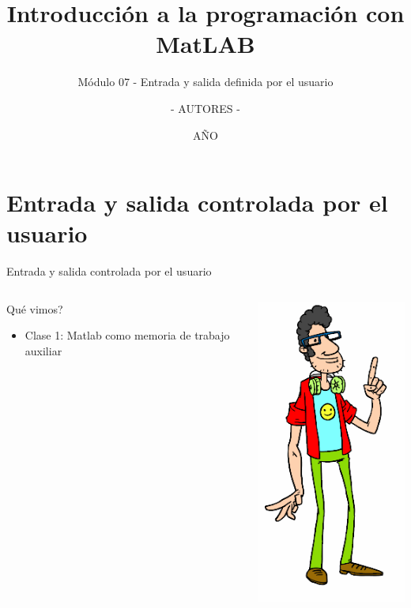 \documentclass{bredelebeamer}
\title[Programación en MatLAB]{Introducción a la programación con MatLAB}
\subtitle{Módulo 07 - Entrada y salida definida por el usuario}
\author{- AUTORES - \inst{1}}
\institute[UNIVERSIDAD]
{
  \inst{1}%
  - NOMBRE UNIVERSIDAD - 
  }
\date{AÑO}
\begin{document}
\begin{frame}
  \titlepage 
\end{frame}





\section{Entrada y salida controlada por el usuario}

\begin{frame}{Entrada y salida controlada por el usuario}
\begin{columns}
\begin{column}{0.5\textwidth}
Qué vimos?
\begin{itemize}
\item Clase 1: Matlab como memoria de trabajo auxiliar
\end{itemize}
\end{column}
\begin{column}{0.5\textwidth}
\begin{center}
\includegraphics[scale=0.3]{images/img42.png}
\end{center}
\end{column}
\end{columns}
\end{frame}
\end{document}
